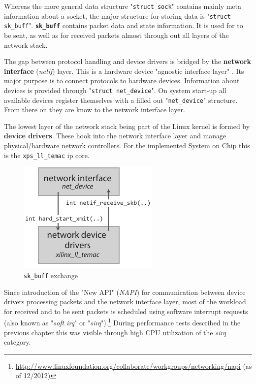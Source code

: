 Whereas the more general data structure "\texttt{struct sock}" contains mainly meta information about a socket, the major structure for storing data is "\texttt{struct sk\_buff}". \textbf{\texttt{sk\_buff}} contains packet data and state information. It is used for to be sent, as well as for received packets almost through out all layers of the network stack. \cite{netstackana}

The gap between protocol handling and device drivers is bridged by the \textbf{network interface} (\textit{netif}) layer. This is a hardware device "agnostic interface layer" \cite{netstackana}. Its major purpose is to connect protocols to hardware devices. Information about devices is provided through "\texttt{struct net\_device}". On system start-up all available devices register themselves with a filled out "\texttt{net\_device}" structure. From there on they are know to the network interface layer.

The lowest layer of the network stack being part of the Linux kernel is formed by \textbf{device drivers}. These hook into the network interface layer and manage physical/hardware network controllers. For the implemented System on Chip this is the \texttt{xps\_ll\_temac} \gls{ip} core.

\begin{figure}
	\centering
	\includegraphics[scale=1]{images/netif-dev.pdf}
	\caption{\texttt{sk\_buff} exchange}
	\label{fig:netif-dev}
\end{figure}

Since introduction of the "New API" (\textit{NAPI}) for communication between device drivers processing packets and the network interface layer, most of the workload for received and to be sent packets is scheduled using software interrupt requests (also known as "\textit{soft irq}" or "\textit{sirq}").\footnote{\url{http://www.linuxfoundation.org/collaborate/workgroups/networking/napi} (as of 12/2012)} During performance tests described in the previous chapter this was visible through high CPU utilization of the \textit{sirq} category.

